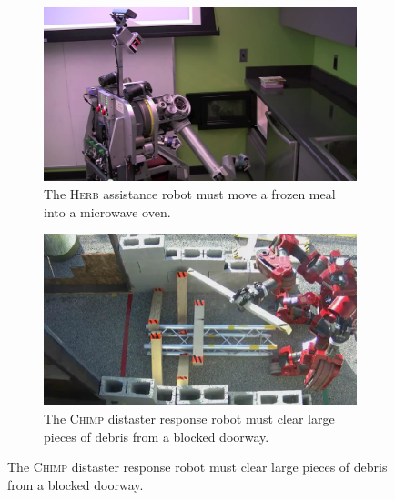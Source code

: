\begin{figure}
{\setlength{\offsetpage}{0.5in}
\begin{widepage}
   \centering
   \begin{subfigure}[t]{0.48\textwidth}
      \includegraphics[width=\textwidth]{figs/herb-microwave-intro.png}
      \caption{The \textsc{Herb} assistance robot
         must move a frozen meal into a microwave oven.
         }
   \end{subfigure}%
   \quad%
   \begin{subfigure}[t]{0.48\textwidth}
      \includegraphics[width=\textwidth]{figs/chimp-debris-overhead.png}
      \caption{The \textsc{Chimp} distaster response robot
         must clear large pieces of debris from a blocked doorway.}
   \end{subfigure}
   

\end{widepage}}
\end{figure}
